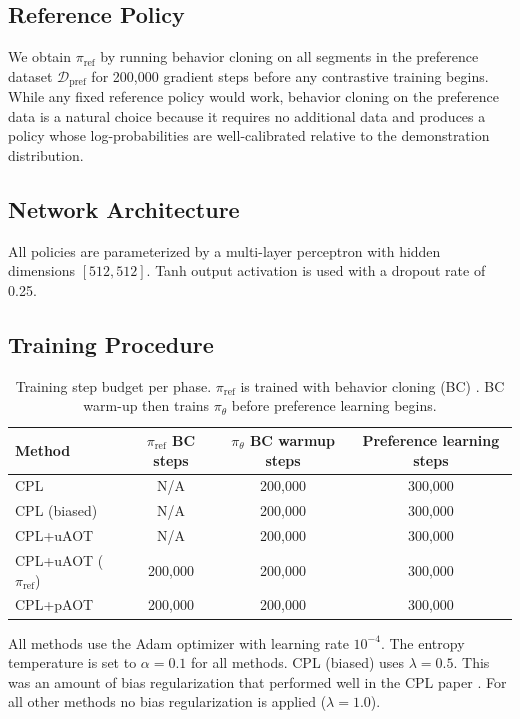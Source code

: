 \documentclass[11pt]{article}
\begin{document}
\subsection{Reference Policy}

We obtain $\pi_{\text{ref}}$ by running behavior cloning on all segments in the preference dataset $\mathcal{D}_{\text{pref}}$ for 200{,}000 gradient steps before any contrastive training begins. While any fixed reference policy would work, behavior cloning on the preference data is a natural choice because it requires no additional data and produces a policy whose log-probabilities are well-calibrated relative to the demonstration distribution.

\subsection{Network Architecture}

All policies are parameterized by a multi-layer perceptron with hidden dimensions $[512, 512]$. Tanh output activation is used with a dropout rate of 0.25.

\subsection{Training Procedure}

\begin{table}[h]
\centering
\begin{tabular}{lccc}
\toprule
Method & $\pi_{\text{ref}}$ BC steps & $\pi_\theta$ BC warmup steps & Preference learning steps \\
\midrule
CPL     & N/A     & 200{,}000 & 300{,}000 \\
CPL (biased)     & N/A     & 200{,}000 & 300{,}000 \\
CPL+uAOT & N/A & 200{,}000 & 300{,}000 \\
CPL+uAOT ($\pi_{\text{ref}}$) & 200{,}000 & 200{,}000 & 300{,}000 \\
CPL+pAOT   & 200{,}000 & 200{,}000 & 300{,}000 \\
\bottomrule
\end{tabular}
\caption{Training step budget per phase. $\pi_{\text{ref}}$ is trained with behavior cloning (BC) \cite{torabi2018bco}. BC warm-up then trains $\pi_\theta$ before preference learning begins.}
\label{tab:training_phases}
\end{table}

All methods use the Adam optimizer with learning rate $10^{-4}$. The entropy temperature is set to $\alpha = 0.1$ for all methods. CPL (biased) uses $\lambda = 0.5$. This was an amount of bias regularization that performed well in the CPL paper \cite{hejna2024cpl}. For all other methods no bias regularization is applied ($\lambda = 1.0$).
\end{document}
